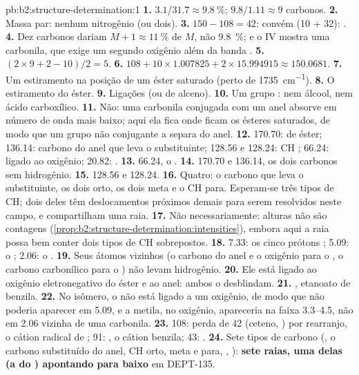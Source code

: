 \begin{solution}{pb:b2:structure-determination:1}
\textbf{1.} $3.1/31.7 \approx 9.8~\%$; $9.8/1.11 \approx 9$ carbonos.
\textbf{2.} Massa par: nenhum nitrogênio (ou dois).
\textbf{3.} $150 - 108 = 42$:  convém (10 + 32): .
\textbf{4.} Dez carbonos dariam $M+1 \approx 11~\%$ de $M$, não 9.8~\%; e o IV mostra uma
carbonila, que exige um segundo oxigênio além da banda .
\textbf{5.} $(2 \times 9 + 2 - 10)/2 = 5$.
\textbf{6.} $108 + 10 \times 1.007825 + 2 \times 15.994915 \approx 150.0681$.
\textbf{7.} Um estiramento  na posição de um éster saturado (perto de \qty{1735}{cm^{-1}}).
\textbf{8.} O estiramento  do éster.
\textbf{9.} Ligações   (ou de alceno).
\textbf{10.} Um grupo : nem álcool, nem ácido carboxílico.
\textbf{11.} Não: uma carbonila conjugada com um anel absorve em número de onda mais baixo; aqui ela fica
onde ficam os ésteres saturados, de modo que um grupo não conjugante a separa do anel.
\textbf{12.} 170.70:  de éster; 136.14: carbono do anel que leva o substituinte; 128.56 e 128.24:
CH ; 66.24:  ligado ao oxigênio; 20.82: .
\textbf{13.} 66.24, o .
\textbf{14.} 170.70 e 136.14, os dois carbonos sem hidrogênio.
\textbf{15.} 128.56 e 128.24.
\textbf{16.} Quatro: o carbono que leva o substituinte, os dois orto, os dois meta e o CH para. Esperam-se
três tipos de CH; dois deles têm deslocamentos próximos demais para serem resolvidos neste campo, e
compartilham uma raia.
\textbf{17.} Não necessariamente: alturas não são contagens (\cref{prop:b2:structure-determination:intensities}),
embora aqui a raia possa bem conter dois tipos de CH sobrepostos.
\textbf{18.} 7.33: os cinco prótons ; 5.09: o ; 2.06: o .
\textbf{19.} Seus átomos vizinhos (o carbono do anel e o oxigênio para o , o carbono carbonílico
para o ) não levam hidrogênio.
\textbf{20.} Ele está ligado ao oxigênio eletronegativo do éster e ao anel: ambos o desblindam.
\textbf{21.} , etanoato de benzila.
\textbf{22.} No isômero, o  não está ligado a um oxigênio, de modo que não poderia aparecer em
5.09, e a metila, no oxigênio, apareceria na faixa 3.3--4.5, não em 2.06 vizinha de uma carbonila.
\textbf{23.} 108: perda de 42 (ceteno, ) por rearranjo, o cátion radical de
; 91: , o cátion benzila; 43: .
\textbf{24.} Sete tipos de carbono (, o carbono substituído do anel, CH orto, meta e para,
, ): \textbf{sete raias, uma delas (a do ) apontando para baixo} em DEPT-135.
\end{solution}
